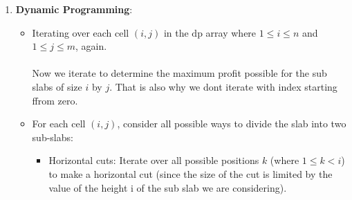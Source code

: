 \documentclass{article}
\begin{document}
{\begin{enumerate}
\begin{itemize}
      \item Setting $\text{dp}[i][j]$ equal to $\text{price}[i - 1][j - 1]$. This step ensures that $\text{dp}[i][j]$ holds the price of the sub-slab with dimensions $i \times j$.\\\\
      By assigning the prices of individual cells of the marble slab to the corresponding cells in the dynamic programming table, we establish the base cases for our dynamic programming approach. These base cases represent the simplest sub problems, where the sub-slab dimensions are 1×1, and the maximum profit is simply the price of the single cell. As we start cutting the slabs we compare the prices set for each smaller slab with the prices of the composite sub slabs with in the smaller slabs and correspondingly update the value in the next step.\\
    \end{itemize}
  
  \item \textbf{Dynamic Programming}:
    \begin{itemize}
      \item Iterating over each cell $(i, j)$ in the $\text{dp}$ array where $1 \leq i \leq n$ and $1 \leq j \leq m$, again.\\\\
      Now we iterate to determine the maximum profit possible for the sub slabs of size $i$ by $j$. That is also why we dont iterate with index starting ffrom zero.\\
      \item For each cell $(i, j)$, consider all possible ways to divide the slab into two sub-slabs:\\
        \begin{itemize}
          \item Horizontal cuts: Iterate over all possible positions $k$ (where $1 \leq k < i$) to make a horizontal cut (since the size of the cut is limited by the value of the height i of the sub slab we are considering). \\
          

\end{itemize}
\end{itemize}
\end{enumerate}}
\end{document}
